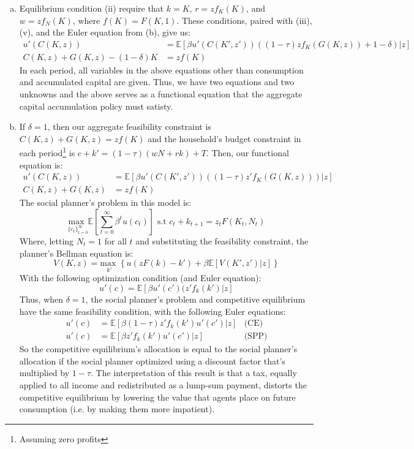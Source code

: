 \documentclass{article}
\newcommand{\usmax}[1]{\underset{#1}{\text{max }}}
\newcommand{\E}[1]{\mathbb{E}\left[#1\right]} %
\begin{document}
\begin{enumerate}[(a)]
	\item Equilibrium condition (ii) require that ${k=K}$, ${r=zf_K(K)}$, and ${w=zf_N(K)}$, where ${f(K) = F(K,1)}$. These conditions, paired with (iii), (v), and the Euler equation from (b), give us:
		\begin{align*}
			u'(C(K,z)) &= \E{\beta u'(C(K',z'))((1-\tau)zf_K(G(K,z))+1-\delta)|z}	\\
			C(K,z) + G(K,z) - (1-\delta)K &= zf(K)
		\end{align*}
		In each period, all variables in the above equations other than consumption and accumulated capital are given. Thus, we have two equations and two unknowns and the above serves as a functional equation that the aggregate capital accumulation policy must satisty.
	
	\item If ${\delta=1}$, then our aggregate feasibility constraint is ${C(K,z) + G(K,z) = zf(K)}$ and the household's budget constraint in each period\footnote{Assuming zero profits} is ${c + k' = (1-\tau)\left(wN + rk\right) +T}$. Then, our functional equation is:
		\begin{align*}
			u'(C(K,z)) &= \E{\beta u'(C(K',z'))((1-\tau)z'f_K(G(K,z)))|z}	\\
			C(K,z) + G(K,z) &= zf(K)
		\end{align*}
		The social planner's problem in this model is:
		\[
			\usmax{\{c_t\}_{t=0}^\infty}\E{\sum_{t=0}^\infty \beta^tu(c_t)}\text{ s.t } c_t + k_{t+1} = z_tF(K_t,N_t)
		\]
		Where, letting ${N_t=1}$ for all $t$ and substituting the feasibility constraint, the planner's Bellman equation is:
		\[
			V(K,z) = \usmax{k'}\left\{u(zF(k)-k') + \beta\E{V(K',z')|z}\right\}
		\]
		With the following optimization condition (and Euler equation):
		\[
			u'(c) = \E{\beta u'(c')(z'f_k(k')|z}	
		\]
		Thus, when ${\delta=1}$, the social planner's problem and competitive equilibrium have the same feasibility condition, with the following Euler equations:
		\begin{align*}
			u'(c) &= \E{\beta(1-\tau)z'f_k(k')u'(c')|z}	&\text{(CE)}	\\
			u'(c) &= \E{\beta z'f_k(k') u'(c')|z}		&\text{(SPP)}
		\end{align*}
		So the competitive equilibrium's allocation is equal to the social planner's allocation if the social planner optimized using a discount factor that's multiplied by ${1-\tau}$. The interpretation of this result is that a tax, equally applied to all income and redistributed as a lump-sum payment, distorts the competitive equilibrium by lowering the value that agents place on future consumption (i.e. by making them more impatient).
	
\end{enumerate}
\end{document}
